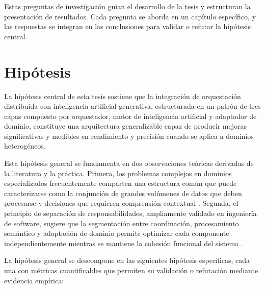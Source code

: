 \documentclass[12pt,a4paper,twoside]{book}
\begin{document}
Estas preguntas de investigación guian el desarrollo de la tesis y estructuran la presentación de resultados. Cada pregunta se aborda en un capítulo específico, y las respuestas se integran en las conclusiones para validar o refutar la hipótesis central.

\section{Hipótesis}

La hipótesis central de esta tesis sostiene que la integración de orquestación distribuida con inteligencia artificial generativa, estructurada en un patrón de tres capas compuesto por orquestador, motor de inteligencia artificial y adaptador de dominio, constituye una arquitectura generalizable capaz de producir mejoras significativas y medibles en rendimiento y precisión cuando se aplica a dominios heterogéneos.

Esta hipótesis general se fundamenta en dos observaciones teóricas derivadas de la literatura y la práctica. Primera, los problemas complejos en dominios especializados frecuentemente comparten una estructura común que puede caracterizarse como la conjunción de grandes volúmenes de datos que deben procesarse y decisiones que requieren comprensión contextual \cite{dean2008mapreduce, lewis2020rag}. Segunda, el principio de separación de responsabilidades, ampliamente validado en ingeniería de software, sugiere que la segmentación entre coordinación, procesamiento semántico y adaptación de dominio permite optimizar cada componente independientemente mientras se mantiene la cohesión funcional del sistema \cite{hewitt1973actors}.

La hipótesis general se descompone en las siguientes hipótesis específicas, cada una con métricas cuantificables que permiten su validación o refutación mediante evidencia empírica:
\end{document}
